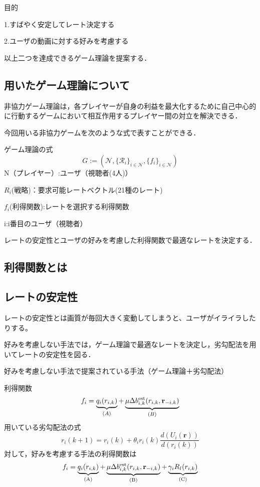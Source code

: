 \documentclass[rinkou,a4paper,uplatex]{ieicej}
\begin{document}
目的

1.すばやく安定してレート決定する

2.ユーザの動画に対する好みを考慮する

以上二つを達成できるゲーム理論を提案する．

\subsection{用いたゲーム理論について}
  非協力ゲーム理論は，各プレイヤーが自身の利益を最大化するために自己中心的に行動するゲームにおいて相互作用するプレイヤー間の対立を解決できる．

  今回用いる非協力ゲームを次のような式で表すことができる．
  
ゲーム理論の式
\begin{equation}
G:= (\mathscr{N},\{{\mathscr{R}_i}\}_{i\in \mathscr{N}} ,\{{f_{i}}\}_{i\in \mathscr{N}})
\end{equation}
N（プレイヤー）:ユーザ（視聴者(4人)）

$R_i$(戦略)：要求可能レートベクトル(21種のレート)

$f_i$(利得関数):レートを選択する利得関数

i:i番目のユーザ（視聴者）

レートの安定性とユーザの好みを考慮した利得関数で最適なレートを決定する．

\subsection{利得関数とは}

\subsection{レートの安定性}
レートの安定性とは画質が毎回大きく変動してしまうと、ユーザがイライラしたりする。

好みを考慮しない手法では，ゲーム理論で最適なレートを決定し，劣勾配法を用いてレートの安定性を図る．

好みを考慮しない手法で提案されている手法（ゲーム理論＋劣勾配法）

利得関数
\begin{equation}
 f_{i}=\underbrace{q_{i}(r_{i,k})}_{(A)}+\underbrace{\mu\Delta{b^{\rm{est}}_{i,k}}(r_{i,k},\mathbf{r}_{-i,k})}_{(B)}
\end{equation}
用いている劣勾配法の式
\begin{equation}
 r_i(k+1)=r_i(k)+θ_ir_i(k)\frac{d(U_
 i(\mathbf{r}))}{d(r_i(k))}
\end{equation}
対して，好みを考慮する手法の利得関数は
\begin{equation}
f_{i}=\underbrace{q_{i}(r_{i,k})}_{(\rm{A})}+\underbrace{\mu\Delta{b^{\rm{est}}_{i,k}}(r_{i,k},\mathbf{r}_{-i,k})}_{(\rm{B})}+\underbrace{\gamma_i{R}_{\rm{f}}(r_{i,k})}_{(\rm{C})}
 \end{equation}
 
\end{document}
